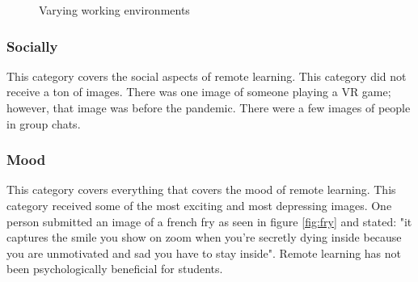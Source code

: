 \documentclass[12pt,
 reprint,
nofootinbib,
 amsmath,amssymb,
 aps,
floatfix,
]{revtex4-2}
\begin{document}
\begin{figure}[h!]
    \centering
    \qquad
    \caption{Varying working environments}%
    \label{fig:desks}%
\end{figure}

\subsubsection{Socially}

This category covers the social aspects of remote learning. This category did not receive a ton of images. There was one image of someone playing a VR game; however, that image was before the pandemic. There were a few images of people in group chats.

\subsubsection{Mood}

This category covers everything that covers the mood of remote learning. This category received some of the most exciting and most depressing images. One person submitted an image of a french fry as seen in figure \ref{fig:fry} and stated: "it captures the smile you show on zoom when you're secretly dying inside because you are unmotivated and sad you have to stay inside". Remote learning has not been psychologically beneficial for students. 
\end{document}
